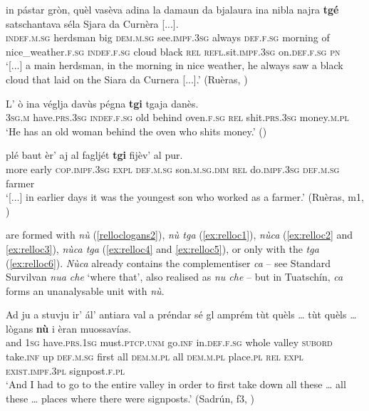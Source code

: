 \ea
\label{ex:reltge1}
\gll [...] in pástar gròn, quèl vasèva adina la damaun da bjalaura ina nibla najra \textbf{tgé} satschantava séla Sjara da Curnèra [...].\\
{} \textsc{indef.m.sg} herdsman big \textsc{dem.m.sg} see.\textsc{impf.3sg} always \textsc{def.f.sg} morning of nice\_weather.\textsc{f.sg} \textsc{indef.f.sg} cloud black \textsc{rel} \textsc{refl}.sit.\textsc{impf.3sg} on.\textsc{def.f.sg} \textsc{pn}\\
\glt `[...] a main herdsman, in the morning in nice weather, he always saw a black cloud that laid on the Siara da Curnera [...].' (Ruèras, \citealt[62]{Büchli1966})
\z

\ea
\label{ex:reltgi1}
\gll L' ò ina véglja davùs pégna \textbf{tgi} tgaja danès.\\
\textsc{3sg.m} have.\textsc{prs.3sg} \textsc{indef.f.sg} old behind oven.\textsc{f.sg} \textsc{rel} shit.\textsc{prs.3sg} money.\textsc{m.pl}\\
\glt `He has an old woman behind the oven who shits money.' ()
\z

\ea
\label{ex:reltgi2}
\gll  [...] plé baut èr’ aj al fagljét \textbf{tgi} fijèv’ al pur. \\
{} more early \textsc{cop.impf.3sg} \textsc{expl} \textsc{def.m.sg}  son.\textsc{m.sg.dim} \textsc{rel} do.\textsc{impf.3sg} \textsc{def.m.sg} farmer \\
\glt `[...] in earlier days it was the youngest son who worked as a farmer.' (Ruèras, m1, )
\z

 are formed with \textit{nù} (\ref{relloclogans2}), \textit{nù tga} (\ref{ex:relloc1}), \textit{nùca} (\ref{ex:relloc2} and \ref{ex:relloc3}), \textit{nùca tga} (\ref{ex:relloc4} and \ref{ex:relloc5}), or only with the  \textit{tga} (\ref{ex:relloc6}). \textit{Nùca} already contains the complementiser \textit{ca} -- see Standard Survilvan \textit{nua che} ‘where that’, also realised as \textit{nu che} -- but in Tuatschín, \textit{ca} forms an unanalysable unit with \textit{nù}.

\ea
\label{relloclogans2}
\gll Ad ju a stuvju ir’ ál’ antiara val a préndar sé gl amprém tùt quèls … tùt quèls … lògans \textbf{nù} i èran muossavías.\\
and \textsc{1sg} have.\textsc{prs.1sg} must.\textsc{ptcp.unm} go.\textsc{inf} in.\textsc{def.f.sg} whole valley \textsc{subord} take.\textsc{inf} up \textsc{def.m.sg} first all \textsc{dem.m.pl} {} all \textsc{dem.m.pl} {} place.\textsc{pl} \textsc{rel} \textsc{expl} \textsc{exist.impf.3pl} signpost.\textsc{f.pl}\\
\glt `And I had to go to the entire valley in order to first take down all these … all these … places where there were signposts.' (Sadrún, f3, )
\z


